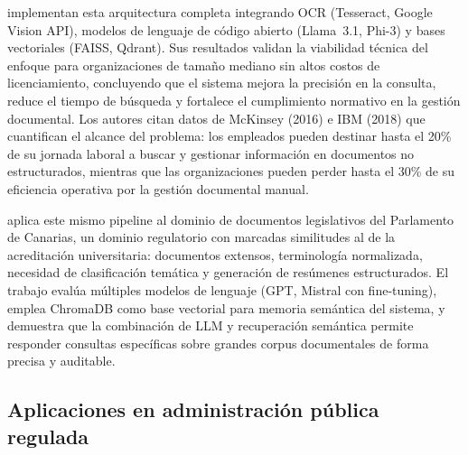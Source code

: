 \citet{cascavita2025sistema} implementan esta arquitectura completa integrando OCR (Tesseract, Google Vision API), modelos de lenguaje de código abierto (Llama~3.1, Phi-3) y bases vectoriales (FAISS, Qdrant). Sus resultados validan la viabilidad técnica del enfoque para organizaciones de tamaño mediano sin altos costos de licenciamiento, concluyendo que el sistema mejora la precisión en la consulta, reduce el tiempo de búsqueda y fortalece el cumplimiento normativo en la gestión documental. Los autores citan datos de McKinsey (2016) e IBM (2018) que cuantifican el alcance del problema: los empleados pueden destinar hasta el 20\% de su jornada laboral a buscar y gestionar información en documentos no estructurados, mientras que las organizaciones pueden perder hasta el 30\% de su eficiencia operativa por la gestión documental manual.

\citet{torres2024desarrollo} aplica este mismo pipeline al dominio de documentos legislativos del Parlamento de Canarias, un dominio regulatorio con marcadas similitudes al de la acreditación universitaria: documentos extensos, terminología normalizada, necesidad de clasificación temática y generación de resúmenes estructurados. El trabajo evalúa múltiples modelos de lenguaje (GPT, Mistral con fine-tuning), emplea ChromaDB como base vectorial para memoria semántica del sistema, y demuestra que la combinación de LLM y recuperación semántica permite responder consultas específicas sobre grandes corpus documentales de forma precisa y auditable.

\subsection{Aplicaciones en administración pública regulada}

